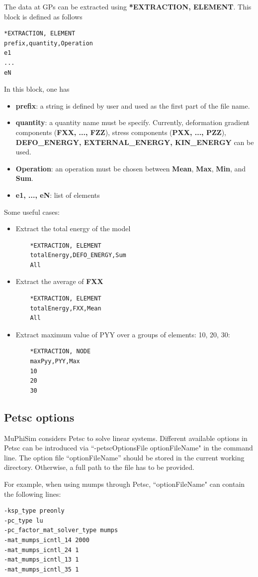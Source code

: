 \documentclass[oneside,11pt,times]{book}
\begin{document}
The data at GPs can be extracted using \textbf{*EXTRACTION, ELEMENT}. This block is defined as follows
\begin{lstlisting}
*EXTRACTION, ELEMENT
prefix,quantity,Operation
e1
...
eN
\end{lstlisting}
In this block, one has
\begin{itemize}
	\item \textbf{prefix}: a string is defined by user and used as the first part of the file name.
	\item \textbf{quantity}: a quantity name must be specify. Currently, deformation gradient components (\textbf{FXX, ..., FZZ}), stress components (\textbf{PXX, ..., PZZ}), \textbf{DEFO\_ENERGY, EXTERNAL\_ENERGY, KIN\_ENERGY} can be used.
	\item \textbf{Operation}: an operation must be chosen between \textbf{Mean}, \textbf{Max}, \textbf{Min}, and \textbf{Sum}.
	\item \textbf{e1, ..., eN}: list of elements
\end{itemize}
Some useful cases:
\begin{itemize}
	\item Extract the total energy of the model
	\begin{lstlisting}
	*EXTRACTION, ELEMENT
	totalEnergy,DEFO_ENERGY,Sum
	All
	\end{lstlisting}
	\item Extract the average of \textbf{FXX}
	\begin{lstlisting}
	*EXTRACTION, ELEMENT
	totalEnergy,FXX,Mean
	All
	\end{lstlisting}
	\item Extract maximum value of PYY over a groups of elements: 10, 20, 30:
	\begin{lstlisting}
	*EXTRACTION, NODE
	maxPyy,PYY,Max
	10
	20
	30
	\end{lstlisting}
\end{itemize}

\subsection{Petsc options}
MuPhiSim considers Petsc to solve linear systems. Different available options in Petsc can be introduced via ``-petscOptionsFile optionFileName" in the command line. The option file ``optionFileName'' should be stored in the current working directory. Otherwise, a full path to the file has to be provided. 

For example, when using mumps through Petsc, ``optionFileName" can contain the following lines:
\begin{lstlisting}
-ksp_type preonly
-pc_type lu
-pc_factor_mat_solver_type mumps
-mat_mumps_icntl_14 2000
-mat_mumps_icntl_24 1
-mat_mumps_icntl_13 1
-mat_mumps_icntl_35 1
\end{lstlisting}
\end{document}
